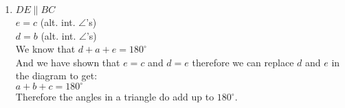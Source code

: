 \begin{eocsolutions}{}
{\begin{enumerate}[itemsep=5pt, label=\textbf{\arabic*}. ]
\begin{enumerate}[noitemsep, label=\textbf{(\alph*)} ]
		\item 
In $\triangle LMS$ and $\triangle LOS$\\
$LM = LO$ (given)\\
$MS=SO$ (given)\\
$LS$ is a common side\\
$\therefore \triangle LMS \equiv \triangle LOS$ (SSS)\\
$\therefore \hat{L_1} = \hat{L_2}$
		\item 
In $\triangle LON$ and $\triangle LMN$\\
$LO = LM$ (given)\\
$\hat{L_1} = \hat{L_2}$ (proved above)\\
$LN$ is a common side\\
$\therefore \triangle LON \equiv \triangle LMN$ (SSS)\\
$\therefore \hat{L_1} = \hat{L_2}$
		\item %
In $\hat{M_1} = \hat{O_1}$ ($\triangle LON \equiv \triangle LMN$)\\
and $\hat{L_1} = \hat{L_2}$ (proved above)\\
$\therefore$ in $\triangle LMO\\
\hat{L_1} + \hat{L_2} + \hat{M_1} + \hat{O_1} = 180^{\circ}$ (sum of $\angle$'s in $\triangle$)\\
$\therefore 2\hat{L_1} + 2\hat{O_1} = 180^{\circ}\\
2(\hat{L_1} + \hat{O_1}) = 180^{\circ}\\
\hat{L_1} + \hat{O_1} = 90^{\circ}\\$
but $\hat{S_1} = \hat{O_1} + \hat{L_2}$ (ext. $\angle$ of $\triangle=$ sum of int. opp. $\angle$'s)\\
$\therefore \hat{S_1} = 90^{\circ}\\
\therefore MO \perp LN$
	  \end{enumerate}
\item %
$DE \parallel BC$\\
$e=c$ (alt. int. $\angle$'s)\\
$d=b$ (alt. int. $\angle$'s)\\
We know that $d+a+e=180^\circ$\\
And we have shown that $e=c$ and $d=e$ therefore we can replace $d$ and $e$ in the diagram to get:\\
$a+b+c = 180^\circ$\\
Therefore the angles in a triangle do add up to $180^\circ$. 


\end{enumerate}}
\end{eocsolutions}
